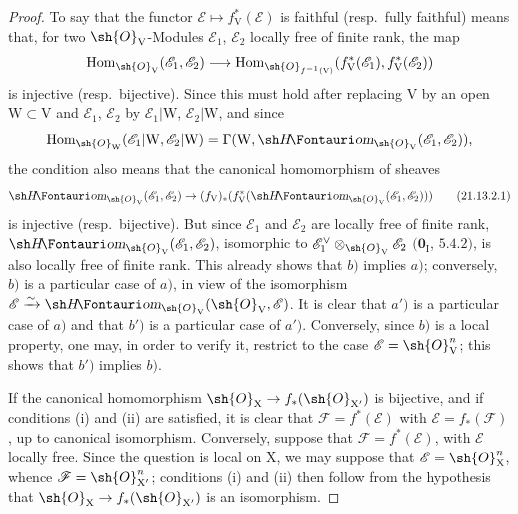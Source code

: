 \begin{proof}
To say that the functor $\mathscr{E}\mapsto f_{\mathrm{V}}^*(\mathscr{E})$ is faithful (resp.\ fully faithful) means that, for two $\sh{O}_{\mathrm{V}}$-Modules $\mathscr{E}_1$, $\mathscr{E}_2$ locally free of finite rank, the map
\[
  \operatorname{Hom}_{\sh{O}_{\mathrm{V}}}(\mathscr{E}_1,\mathscr{E}_2)
  \longrightarrow
  \operatorname{Hom}_{\sh{O}_{f^{-1}(\mathrm{V})}}(f_{\mathrm{V}}^*(\mathscr{E}_1),f_{\mathrm{V}}^*(\mathscr{E}_2))
\]
is injective (resp.\ bijective). Since this must hold after replacing $\mathrm{V}$ by an open $\mathrm{W}\subset\mathrm{V}$ and $\mathscr{E}_1$, $\mathscr{E}_2$ by $\mathscr{E}_1|\mathrm{W}$, $\mathscr{E}_2|\mathrm{W}$, and since
\[
  \operatorname{Hom}_{\sh{O}_{\mathrm{W}}}(\mathscr{E}_1|\mathrm{W},\mathscr{E}_2|\mathrm{W})
  =\Gamma(\mathrm{W},\shHom_{\sh{O}_{\mathrm{V}}}(\mathscr{E}_1,\mathscr{E}_2)),
\]
the condition also means that the canonical homomorphism of sheaves
\[
\label{IV.21.13.2.1}
  \shHom_{\sh{O}_{\mathrm{V}}}(\mathscr{E}_1,\mathscr{E}_2)\to(f_{\mathrm{V}})_*(f_{\mathrm{V}}^*(\shHom_{\sh{O}_{\mathrm{V}}}(\mathscr{E}_1,\mathscr{E}_2)))
  \tag{21.13.2.1}
\]
is injective (resp.\ bijective).
But since $\mathscr{E}_1$ and $\mathscr{E}_2$ are locally free of finite rank, $\shHom_{\sh{O}_{\mathrm{V}}}(\mathscr{E}_1,\mathscr{E}_2)$, isomorphic to $\mathscr{E}_1^\vee\otimes_{\sh{O}_{\mathrm{V}}}\mathscr{E}_2$ $(\mathbf{0}_{\mathrm{I}}$, $5.4.2)$, is also locally free of finite rank. This already shows that $b)$ implies $a)$; conversely, $b)$ is a particular case of $a)$, in view of the isomorphism $\mathscr{E}\xrightarrow{\sim}\shHom_{\sh{O}_{\mathrm{V}}}(\sh{O}_{\mathrm{V}},\mathscr{E})$.
It is clear that $a')$ is a particular case of $a)$ and that $b')$ is a particular case of $a')$.
Conversely, since $b)$ is a local property, one may, in order to verify it, restrict to the case $\mathscr{E}=\sh{O}_{\mathrm{V}}^n$; this shows that $b')$ implies $b)$.

If the canonical homomorphism $\sh{O}_{\mathrm{X}}\to f_*(\sh{O}_{\mathrm{X}'})$ is bijective, and if conditions (i) and (ii) are satisfied, it is clear that $\mathscr{F}=f^*(\mathscr{E})$ with $\mathscr{E}=f_*(\mathscr{F})$, up to canonical isomorphism.
Conversely, suppose that $\mathscr{F}=f^*(\mathscr{E})$, with $\mathscr{E}$ locally free. Since the question is local on $\mathrm{X}$, we may suppose that $\mathscr{E}=\sh{O}_{\mathrm{X}}^n$, whence $\mathscr{F}=\sh{O}_{\mathrm{X}'}^n$; conditions (i) and (ii) then follow from the hypothesis that $\sh{O}_{\mathrm{X}}\to f_*(\sh{O}_{\mathrm{X}'})$ is an isomorphism.
\end{proof}

